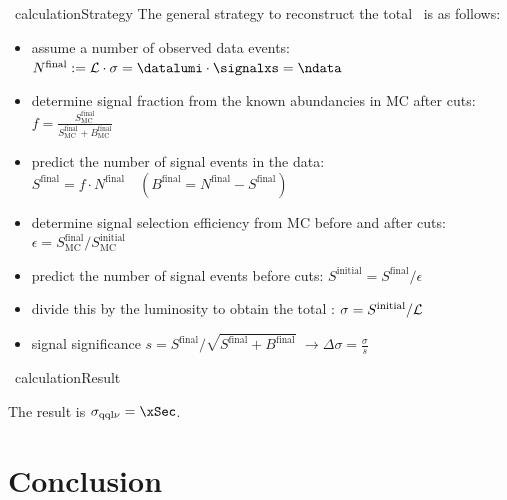 \documentclass{beamer}
\newcommand{\texpath}{../analysis/tex/tex_full}
\begin{document}
\begin{frame}{\Xsec\ calculation}{Strategy}
The general strategy to reconstruct the total \xsec\ is as follows:
\begin{itemize}
\item assume a number of observed data events: \newline
  $N^\mathrm{final} := \lumi \cdot \sigma = \datalumi \cdot \signalxs = \ndata$
\item determine signal fraction from the known abundancies in MC after cuts: \newline
  $f = \frac{S^\mathrm{final}_\mathrm{MC}}{S^\mathrm{final}_\mathrm{MC} + B^\mathrm{final}_\mathrm{MC}}$
\item predict the number of signal events in the data: \newline
  $S^\mathrm{final} = f \cdot N^\mathrm{final} \quad (B^\mathrm{final} = N^\mathrm{final} - S^\mathrm{final})$
\item determine signal selection efficiency from MC before and after cuts: \newline
  $\epsilon = S^\mathrm{final}_\mathrm{MC} / S^\mathrm{initial}_\mathrm{MC}$
\item predict the number of signal events before cuts: \newline
  $S^\mathrm{initial} = S^\mathrm{final} / \epsilon$
\item divide this by the luminosity to obtain the total \xsec: \newline
  $\sigma = S^\mathrm{initial} / \mathcal L$
\item signal significance $s = S^\mathrm{final} / \sqrt{S^\mathrm{final} + B^\mathrm{final}}$ $\rightarrow \Delta\sigma = \frac{\sigma}{s}$ \newline
\end{itemize}

\end{frame}

\begin{frame}{\Xsec\ calculation}{Result}

\vspace{-2em}

\vspace{-1em}
The result is $\sigma_\mathrm{\qqln} = \xSec$.
\end{frame}






\section{Conclusion}
\end{document}
